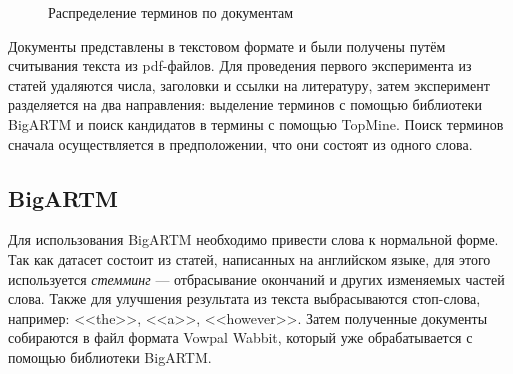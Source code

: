 \documentclass[a4paper, 12pt]{article}
\begin{document}
\begin{figure}[!ht]
    \caption{Распределение терминов по документам}
    \label{fg:Dataset}
\end{figure}

    Документы представлены в текстовом формате и были получены путём считывания текста из pdf-файлов. Для проведения первого эксперимента из статей удаляются числа, заголовки и ссылки на литературу, затем эксперимент разделяется на два направления: выделение терминов с помощью библиотеки BigARTM и поиск кандидатов в термины с помощью TopMine. Поиск терминов сначала осуществляется в предположении, что они состоят из одного слова.

\subsection{BigARTM}
    Для использования BigARTM необходимо привести слова к нормальной форме. Так как датасет состоит из статей, написанных на английском языке, для этого используется \textit{стемминг} --- отбрасывание окончаний и других изменяемых частей слова. Также для улучшения результата из текста выбрасываются стоп-слова, например: <<the>>, <<a>>, <<however>>. Затем полученные документы собираются в файл формата Vowpal Wabbit, который уже обрабатывается с помощью библиотеки BigARTM.
    
\end{document}
